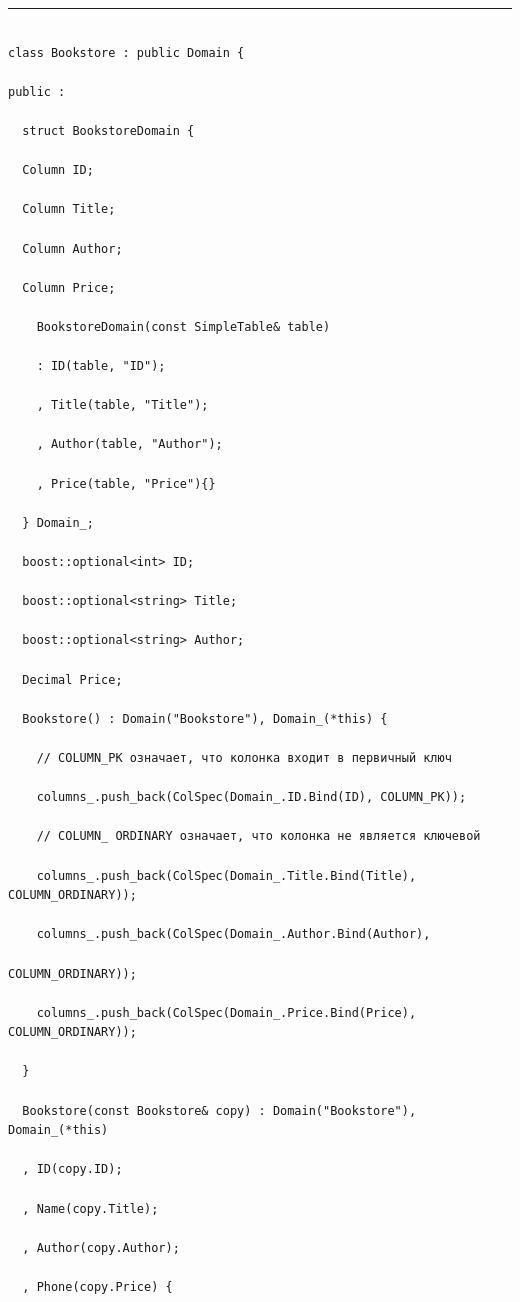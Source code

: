 \hrule



\vspace*{6pt}



\begin{verbatim}

class Bookstore : public Domain {

public :

  struct BookstoreDomain {

  Column ID;

  Column Title;

  Column Author;

  Column Price;

    BookstoreDomain(const SimpleTable& table)

    : ID(table, "ID");

    , Title(table, "Title");

    , Author(table, "Author");

    , Price(table, "Price"){}

  } Domain_;

  boost::optional<int> ID;

  boost::optional<string> Title;

  boost::optional<string> Author;

  Decimal Price;

  Bookstore() : Domain("Bookstore"), Domain_(*this) {

    // COLUMN_PK означает, что колонка входит в первичный ключ

    columns_.push_back(ColSpec(Domain_.ID.Bind(ID), COLUMN_PK));

    // COLUMN_ ORDINARY означает, что колонка не является ключевой

    columns_.push_back(ColSpec(Domain_.Title.Bind(Title), COLUMN_ORDINARY));

    columns_.push_back(ColSpec(Domain_.Author.Bind(Author), 

COLUMN_ORDINARY));

    columns_.push_back(ColSpec(Domain_.Price.Bind(Price), COLUMN_ORDINARY));

  }

  Bookstore(const Bookstore& copy) : Domain("Bookstore"), Domain_(*this)

  , ID(copy.ID);

  , Name(copy.Title);

  , Author(copy.Author);

  , Phone(copy.Price) {


\end{verbatim}
